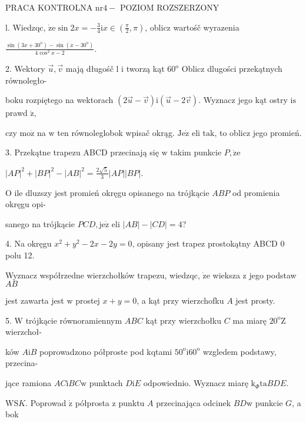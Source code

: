 \documentclass[a4paper,12pt]{article}
\begin{document}
PRACA KONTROLNA $\mathrm{n}\mathrm{r} 4-$ POZIOM ROZSZERZONY

l. Wiedzqc, $\displaystyle \dot{\mathrm{z}}\mathrm{e}\sin 2x=-\frac{3}{4} \mathrm{i}  x\in (\displaystyle \frac{\pi}{2},\pi)$, oblicz wartośč wyrazenia

$\displaystyle \frac{\sin(3x+30^{\mathrm{o}})-\sin(x-30^{\mathrm{o}})}{4\cos^{2}x-2}.$

2. Wektory $\vec{u}, \vec{v}$ mają długośč l $\mathrm{i}$ tworzą kąt $60^{\mathrm{o}}$ Oblicz dlugości przekątnych równoległo-

boku rozpiętego na wektorach $(2\vec{u}-\vec{v})\mathrm{i}(\vec{u}-2\vec{v})$. Wyznacz jego kąt ostry $\mathrm{i}\mathrm{s}$prawd $\acute{\mathrm{z}},$

czy $\mathrm{m}\mathrm{o}\dot{\mathrm{z}}$ na $\mathrm{w}$ ten równoleglobok wpisač okrąg. $\mathrm{J}\mathrm{e}\dot{\mathrm{z}}$ eli $\mathrm{t}\mathrm{a}\mathrm{k}$, to oblicz jego promień.

3. Przekątne trapezu ABCD przecinają się $\mathrm{w}$ takim punkcie $P, \dot{\mathrm{z}}\mathrm{e}$

$|AP|^{2}+|BP|^{2}-|AB|^{2}=\displaystyle \frac{2\sqrt{5}}{3}|AP||BP|.$

$\mathrm{O}$ ile dluzszy jest promień okręgu opisanego na trójkącie $ABP$ od promienia okręgu opi-

sanego na trójkącie $PCD, \mathrm{j}\mathrm{e}\dot{\mathrm{z}}$ eli $|AB|-|CD|=4$?

4. Na okręgu $x^{2}+y^{2}-2x-2y=0$, opisany jest trapez prostokątny ABCD $0$ polu 12.

Wyznacz współrzedne wierzchołków trapezu, wiedzqc, $\dot{\mathrm{z}}\mathrm{e}$ wieksza $\mathrm{z}$ jego podstaw $AB$

jest zawarta jest $\mathrm{w}$ prostej $x+y=0$, a kąt przy wierzchofku $A$ jest prosty.

5. $\mathrm{W}$ trójkącie równoramiennym $ABC$ kąt przy wierzchołku $C$ ma miarę $20^{\mathrm{o}} \mathrm{Z}$ wierzchoł-

ków $A\mathrm{i}B$ poprowadzono półproste pod kqtami $50^{\mathrm{o}}\mathrm{i}60^{\mathrm{o}}$ wzgledem podstawy, przecina-

jące ramiona $AC\mathrm{i}BC\mathrm{w}$ punktach $D\mathrm{i}E$ odpowiednio. Wyznacz miarę $\mathrm{k}_{\Phi}\mathrm{t}\mathrm{a}BDE.$

$\mathrm{W}\mathrm{S}K.$ Poprowad $\acute{\mathrm{z}}$ półprosta $\mathrm{z}$ punktu $A$ przecinająca odcinek $BD\mathrm{w}$ punkcie $G$, a bok
\end{document}
